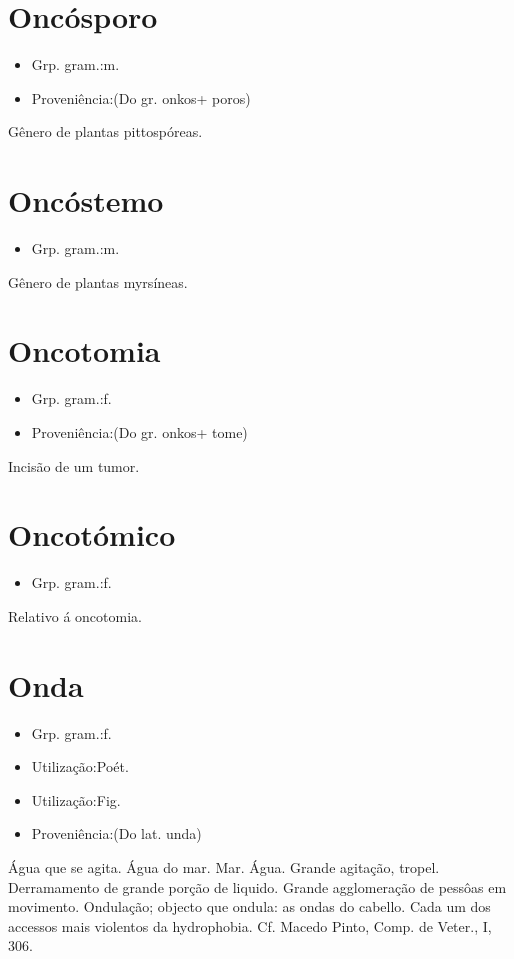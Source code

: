 \section{Oncósporo}
\begin{itemize}
\item {Grp. gram.:m.}
\end{itemize}
\begin{itemize}
\item {Proveniência:(Do gr. \textunderscore onkos\textunderscore  + \textunderscore poros\textunderscore )}
\end{itemize}
Gênero de plantas pittospóreas.
\section{Oncóstemo}
\begin{itemize}
\item {Grp. gram.:m.}
\end{itemize}
Gênero de plantas myrsíneas.
\section{Oncotomia}
\begin{itemize}
\item {Grp. gram.:f.}
\end{itemize}
\begin{itemize}
\item {Proveniência:(Do gr. \textunderscore onkos\textunderscore  + \textunderscore tome\textunderscore )}
\end{itemize}
Incisão de um tumor.
\section{Oncotómico}
\begin{itemize}
\item {Grp. gram.:f.}
\end{itemize}
Relativo á oncotomia.
\section{Onda}
\begin{itemize}
\item {Grp. gram.:f.}
\end{itemize}
\begin{itemize}
\item {Utilização:Poét.}
\end{itemize}
\begin{itemize}
\item {Utilização:Fig.}
\end{itemize}
\begin{itemize}
\item {Proveniência:(Do lat. \textunderscore unda\textunderscore )}
\end{itemize}
Água que se agita.
Água do mar.
Mar.
Água.
Grande agitação, tropel.
Derramamento de grande porção de liquido.
Grande agglomeração de pessôas em movimento.
Ondulação; objecto que ondula: \textunderscore as ondas do cabello\textunderscore .
Cada um dos accessos mais violentos da hydrophobia. Cf. Macedo Pinto, \textunderscore Comp. de Veter.\textunderscore , I, 306.
